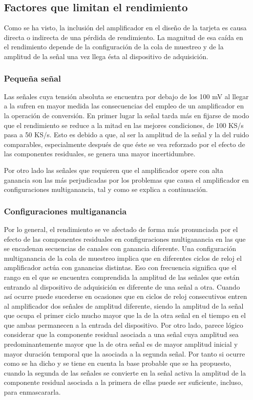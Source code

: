 \subsection{Factores que limitan el rendimiento}

Como se ha visto, la inclusión del amplificador en el diseño de la tarjeta
es causa directa o indirecta de una pérdida de rendimiento. La magnitud de
esa caída en el rendimiento depende de la configuración de la cola de
muestreo y de la amplitud de la señal una vez llega ésta al dispositivo de
adquisición.

\subsubsection{Pequeña señal}

Las señales cuya tensión absoluta se encuentra por debajo de los 100 mV al
llegar a la \kpci{} sufren en mayor medida las consecuencias del empleo de
un amplificador en la operación de conversión. En primer lugar la señal
tarda más en fijarse de modo que el rendimiento se reduce a la mitad en las
mejores condiciones, de 100 KS/s pasa a 50 KS/s. Esto es debido a que, al
ser la amplitud de la señal y la del ruido comparables, especialmente
después de que éste se vea reforzado por el efecto de las componentes
residuales, se genera una mayor incertidumbre.

Por otro lado las señales que requieren que el amplificador opere con alta
ganancia son las más perjudicadas por los problemas que causa el
amplificador en configuraciones multiganancia, tal y como se explica a
continuación.


\subsubsection{Configuraciones multiganancia}

Por lo general, el rendimiento se ve afectado de forma más pronunciada por
el efecto de las componentes residuales en configuraciones multiganancia en
las que se encadenan secuencias de canales con ganancia diferente. Una
configuración multiganancia de la cola de muestreo implica que en
diferentes ciclos de reloj el amplificador actúa con ganancias distintas.
Eso con frecuencia significa que el rango en el que se encuentra
comprendida la amplitud de las señales que están entrando al dispositivo de
adquisición es diferente de una señal a otra. Cuando así ocurre puede
sucederse en ocasiones que en ciclos de reloj consecutivos entren al
amplificador dos señales de amplitud diferente, siendo la amplitud de la
señal que ocupa el primer ciclo mucho mayor que la de la otra señal en el
tiempo en el que ambas permanecen a la entrada del dispositivo. Por otro
lado, parece lógico considerar que la componente residual asociada a una
señal cuya amplitud sea predominantemente mayor que la de otra señal es de
mayor amplitud inicial y mayor duración temporal que la asociada a la
segunda señal. Por tanto si ocurre como se ha dicho y se tiene en cuenta la
base probable que se ha propuesto, cuando la segunda de las señales se
convierte en la señal activa la amplitud de la componente residual asociada
a la primera de ellas puede ser suficiente, incluso, para enmascararla.

